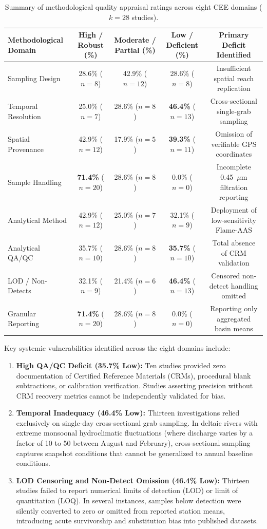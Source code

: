 \documentclass[authoryear,preprint,12pt]{elsarticle}
\begin{document}
\begin{table}[htbp]
\centering
\small
\caption{Summary of methodological quality appraisal ratings across eight CEE domains ($k=28$ studies).}
\label{tab:appraisal_summary}
\begin{tabular}{lcccc}
\toprule
Methodological Domain & High / Robust (\%) & Moderate / Partial (\%) & Low / Deficient (\%) & Primary Deficit Identified \\
\midrule
Sampling Design & 28.6\% ($n=8$) & 42.9\% ($n=12$) & 28.6\% ($n=8$) & Insufficient spatial reach replication \\
Temporal Resolution & 25.0\% ($n=7$) & 28.6\% ($n=8$) & \textbf{46.4\%} ($n=13$) & Cross-sectional single-grab sampling \\
Spatial Provenance & 42.9\% ($n=12$) & 17.9\% ($n=5$) & \textbf{39.3\%} ($n=11$) & Omission of verifiable GPS coordinates \\
Sample Handling & \textbf{71.4\%} ($n=20$) & 28.6\% ($n=8$) & 0.0\% ($n=0$) & Incomplete 0.45~$\mu\text{m}$ filtration reporting \\
Analytical Method & 42.9\% ($n=12$) & 25.0\% ($n=7$) & 32.1\% ($n=9$) & Deployment of low-sensitivity Flame-AAS \\
Analytical QA/QC & 35.7\% ($n=10$) & 28.6\% ($n=8$) & \textbf{35.7\%} ($n=10$) & Total absence of CRM validation \\
LOD / Non-Detects & 32.1\% ($n=9$) & 21.4\% ($n=6$) & \textbf{46.4\%} ($n=13$) & Censored non-detect handling omitted \\
Granular Reporting & \textbf{71.4\%} ($n=20$) & 28.6\% ($n=8$) & 0.0\% ($n=0$) & Reporting only aggregated basin means \\
\bottomrule
\end{tabular}
\end{table}

Key systemic vulnerabilities identified across the eight domains include:
\begin{enumerate}
    \item \textbf{High QA/QC Deficit (35.7\% Low):} Ten studies provided zero documentation of Certified Reference Materials (CRMs), procedural blank subtractions, or calibration verification. Studies asserting precision without CRM recovery metrics cannot be independently validated for bias.
    \item \textbf{Temporal Inadequacy (46.4\% Low):} Thirteen investigations relied exclusively on single-day cross-sectional grab sampling. In deltaic rivers with extreme monsoonal hydroclimatic fluctuations (where discharge varies by a factor of 10 to 50 between August and February), cross-sectional sampling captures snapshot conditions that cannot be generalized to annual baseline conditions.
    \item \textbf{LOD Censoring and Non-Detect Omission (46.4\% Low):} Thirteen studies failed to report numerical limits of detection (LOD) or limit of quantitation (LOQ). In several instances, samples below detection were silently converted to zero or omitted from reported station means, introducing acute survivorship and substitution bias into published datasets.
\end{enumerate}
\end{document}
